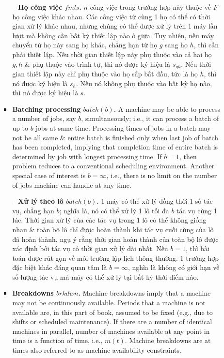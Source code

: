 \documentclass{article}
\begin{document}
\begin{itemize}
\begin{itemize}
\begin{itemize}
            -- {\bf Họ công việc $fmls$.} $n$ công việc trong trường hợp này thuộc về $F$ họ công việc khác nhau. Các công việc từ cùng 1 họ có thể có thời gian xử lý khác nhau, nhưng chúng có thể được xử lý trên 1 máy lần lượt mà không cần bất kỳ thiết lập nào ở giữa. Tuy nhiên, nếu máy chuyển từ họ này sang họ khác, chẳng hạn từ họ $g$ sang họ $h$, thì cần phải thiết lập. Nếu thời gian thiết lập này phụ thuộc vào cả hai họ $g,h$ \& phụ thuộc vào trình tự, thì nó được ký hiệu là $s_{gh}$. Nếu thời gian thiết lập này chỉ phụ thuộc vào họ sắp bắt đầu, tức là họ $h$, thì nó được ký hiệu là $s_h$. Nếu nó không phụ thuộc vào bất kỳ họ nào, thì nó được ký hiệu là $s$.
            \item {\bf Batching processing $batch(b)$.} A machine may be able to process a number of jobs, say $b$, simultaneously; i.e., it can process a batch of up to $b$ jobs at same time. Processing times of jobs in a batch may not be all same \& entire batch is finished only when last job of batch has been completed, implying that completion time of entire batch is determined by job with longest processing time. If $b = 1$, then problem reduces to a conventional scheduling environment. Another special case of interest is $b = \infty$, i.e., there is no limit on the number of jobs machine can handle at any time.

            -- {\bf Xử lý theo lô $batch(b)$.} 1 máy có thể xử lý đồng thời 1 số tác vụ, chẳng hạn $b$; nghĩa là, nó có thể xử lý 1 lô tối đa $b$ tác vụ cùng 1 lúc. Thời gian xử lý của các tác vụ trong 1 lô có thể không giống nhau \& toàn bộ lô chỉ được hoàn thành khi tác vụ cuối cùng của lô đã hoàn thành, ngụ ý rằng thời gian hoàn thành của toàn bộ lô được xác định bởi tác vụ có thời gian xử lý dài nhất. Nếu $b = 1$, thì bài toán được rút gọn về môi trường lập lịch thông thường. 1 trường hợp đặc biệt khác đáng quan tâm là $b = \infty$, nghĩa là không có giới hạn về số lượng tác vụ mà máy có thể xử lý tại bất kỳ thời điểm nào.
            \item {\bf Breakdowns $brkdwn$.} Machine breakdowns imply that a machine may not be continuously available. Periods that a machine is not available are, in this part of book, assumed to be fixed (e.g., due to shifts or scheduled maintenance). If there are a number of identical machines in parallel, number of machines available at any point in time is a function of time, i.e., $m(t)$. Machine breakdowns are at times also referred to as machine availability constraints.


\end{itemize}
\end{itemize}
\end{itemize}
\end{document}
